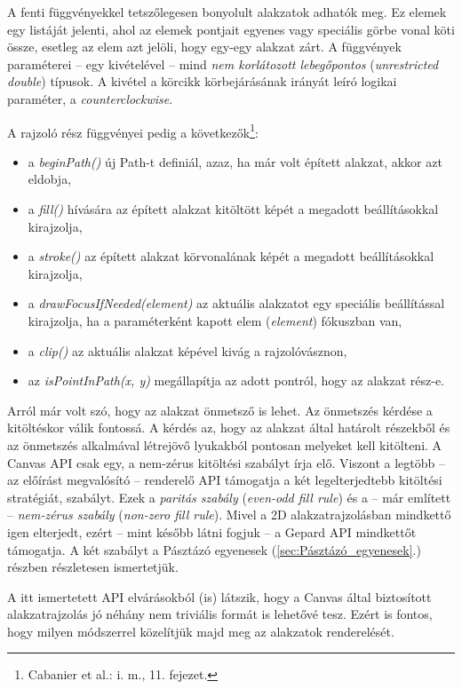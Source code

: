 \documentclass[12pt]{report}
\theoremstyle{definition}
\newcommand{\inenglish}[1]{\textsl{#1}}
\newcommand{\func}[1]{{\textsl{#1}}}
\begin{document}
A fenti függvényekkel tetszőlegesen bonyolult alakzatok adhatók meg. Ez elemek
egy listáját jelenti, ahol az elemek pontjait egyenes vagy speciális görbe
vonal köti össze, esetleg az elem azt jelöli, hogy egy-egy alakzat zárt. A
függvények paraméterei -- egy kivételével -- mind \emph{nem korlátozott
lebegőpontos} (\func{unrestricted double}) típusok. A kivétel a körcikk
körbejárásának irányát leíró logikai paraméter, a \func{counterclockwise}.

A rajzoló rész függvényei pedig a következők\footnote{Cabanier et al.: i.
m., 11. fejezet.}:
\begin{itemize}
  \item a \func{beginPath()} új Path-t definiál, azaz, ha már volt épített
  alakzat, akkor azt eldobja,
  \item a \func{fill()} hívására az épített alakzat kitöltött képét a megadott
  beállításokkal kirajzolja,
  \item a \func{stroke()} az épített alakzat körvonalának képét a megadott
  beállításokkal kirajzolja,
  \item a \func{drawFocusIfNeeded(element)} az aktuális alakzatot egy speciális
  beállítással kirajzolja, ha a paraméterként kapott elem (\func{element})
  fókuszban van,
  \item a \func{clip()} az aktuális alakzat képével kivág a rajzolóvásznon,
  \item az \func{isPointInPath(x, y)} megállapítja az adott pontról, hogy az
  alakzat rész-e.
\end{itemize}

Arról már volt szó, hogy az alakzat önmetsző is lehet. Az önmetszés kérdése a
kitöltéskor válik fontossá. A kérdés az, hogy az alakzat által határolt
részekből és az önmetszés alkalmával létrejövő lyukakból pontosan melyeket kell
kitölteni. A Canvas API csak egy, a nem-zérus kitöltési szabályt írja elő.
Viszont a legtöbb -- az előírást megvalósító -- renderelő API támogatja a két
legelterjedtebb kitöltési stratégiát, szabályt. Ezek a \emph{paritás szabály}
(\inenglish{even-odd fill rule}) és a -- már említett -- \emph{nem-zérus szabály}
(\inenglish{non-zero fill rule}). Mivel a 2D alakzatrajzolásban mindkettő igen
elterjedt, ezért -- mint később látni fogjuk -- a Gepard API mindkettőt
támogatja. A két szabályt a Pásztázó egyenesek (\ref{sec:Pásztázó_egyenesek}.)
részben részletesen ismertetjük.

A itt ismertetett API elvárásokból (is) látszik, hogy a Canvas által
biztosított alakzatrajzolás jó néhány nem triviális formát is lehetővé tesz.
Ezért is fontos, hogy milyen módszerrel közelítjük majd meg az alakzatok
renderelését.
\end{document}
